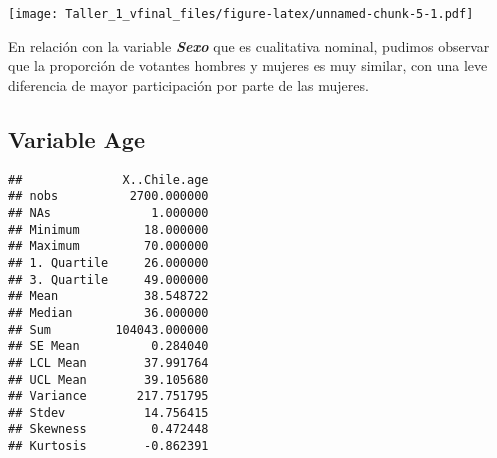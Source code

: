 \documentclass[
]{article}
\newenvironment{Shaded}{\begin{snugshade}}{\end{snugshade}}
\newcommand{\AttributeTok}[1]{\textcolor[rgb]{0.77,0.63,0.00}{#1}}
\newcommand{\CommentTok}[1]{\textcolor[rgb]{0.56,0.35,0.01}{\textit{#1}}}
\newcommand{\DecValTok}[1]{\textcolor[rgb]{0.00,0.00,0.81}{#1}}
\newcommand{\FloatTok}[1]{\textcolor[rgb]{0.00,0.00,0.81}{#1}}
\newcommand{\FunctionTok}[1]{\textcolor[rgb]{0.00,0.00,0.00}{#1}}
\newcommand{\NormalTok}[1]{#1}
\newcommand{\OtherTok}[1]{\textcolor[rgb]{0.56,0.35,0.01}{#1}}
\newcommand{\SpecialCharTok}[1]{\textcolor[rgb]{0.00,0.00,0.00}{#1}}
\newcommand{\StringTok}[1]{\textcolor[rgb]{0.31,0.60,0.02}{#1}}
\begin{document}
\texttt{[image: Taller\_1\_vfinal\_files/figure-latex/unnamed-chunk-5-1.pdf]}

En relación con la variable \textbf{\emph{Sexo}} que es cualitativa
nominal, pudimos observar que la proporción de votantes hombres y
mujeres es muy similar, con una leve diferencia de mayor participación
por parte de las mujeres.

\hypertarget{variable-age}{%
\subsection{\texorpdfstring{Variable
\textbf{Age}}{Variable Age}}\label{variable-age}}

\begin{Shaded}
\end{Shaded}

\begin{verbatim}
##              X..Chile.age
## nobs          2700.000000
## NAs              1.000000
## Minimum         18.000000
## Maximum         70.000000
## 1. Quartile     26.000000
## 3. Quartile     49.000000
## Mean            38.548722
## Median          36.000000
## Sum         104043.000000
## SE Mean          0.284040
## LCL Mean        37.991764
## UCL Mean        39.105680
## Variance       217.751795
## Stdev           14.756415
## Skewness         0.472448
## Kurtosis        -0.862391
\end{verbatim}

\begin{Shaded}
\end{Shaded}
\end{document}
